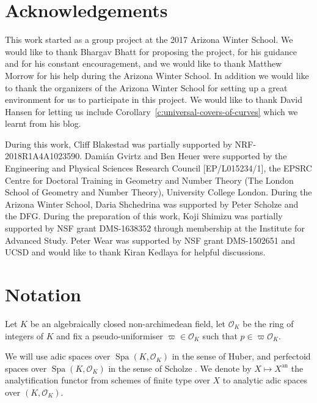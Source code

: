 \documentclass[10pt,oneside]{amsart}
\theoremstyle{definition}
\newcommand{\an}{\mathrm{an}}
\renewcommand{\O}{\mathcal{O}}
\begin{document}
 
 
 \section*{Acknowledgements}
 This work started as a group project at the 2017 Arizona Winter School. We would like to thank Bhargav Bhatt for proposing the project, for his guidance and for his constant encouragement, and we would like to thank Matthew Morrow for his help during the Arizona Winter School. In addition we would like to thank the organizers of the Arizona Winter School for setting up a great environment for us to participate in this project. We would like to thank David Hansen for letting us include Corollary~\ref{c:universal-covers-of-curves} which we learnt from his blog.
 
  During this work, Cliff Blakestad was partially supported by NRF-2018R1A4A1023590.
 Dami\'an Gvirtz and Ben Heuer were supported by the Engineering and Physical Sciences Research Council [EP/L015234/1], the EPSRC Centre for Doctoral Training in Geometry and Number Theory (The London School of Geometry and Number Theory), University College London. 
 During the Arizona Winter School, Daria Shchedrina was supported by Peter Scholze and the DFG.
During the preparation of this work, Koji Shimizu was partially supported by NSF grant DMS-1638352 through membership at the Institute for Advanced Study.
 Peter Wear was supported by NSF grant DMS-1502651 and UCSD and would like to thank Kiran Kedlaya for helpful discussions.


\section*{Notation}
	Let $K$ be an algebraically closed non-archimedean field, let $\mathcal O_K$ be the ring of integers of $K$ and fix a pseudo-uniformiser $\varpi\in \mathcal O_K$ such that $p\in\varpi\mathcal O_K$. 
	
	We will use adic spaces over $\operatorname{Spa}(K,\O_K)$ in the sense of Huber, and perfectoid spaces over $\operatorname{Spa}(K,\O_K)$ in the sense of Scholze \cite{perfectoid}. We denote by $X\mapsto X^{\an}$ the analytification functor from schemes of finite type over $X$ to analytic adic spaces over $(K,\O_K)$.
	
\end{document}
